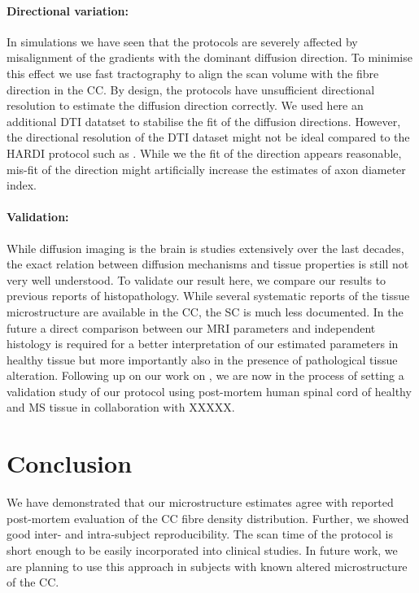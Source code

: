 \paragraph{Directional variation: } In simulations we have seen that the \SF{} protocols are severely affected by misalignment of the gradients with the dominant diffusion direction. To minimise this effect we use fast tractography to align the scan volume with the fibre direction in the CC. By design, the \SF{} protocols have unsufficient directional resolution to estimate the diffusion direction correctly. We used here an additional DTI datatset to stabilise the fit of the diffusion directions. However, the directional resolution of the DTI dataset might not be ideal compared to the HARDI protocol such as \OI. While we the fit of the direction appears reasonable, mis-fit of the direction might artificially increase the estimates of axon diameter index. 

\paragraph{Validation: } While diffusion imaging is the brain is studies extensively over the last decades, the exact relation between diffusion mechanisms and tissue properties is still not very well understood. To validate our result here, we compare our results to previous reports of histopathology. While several systematic reports of the tissue microstructure are available in the CC, the SC is much less documented. In the future a direct comparison between our MRI parameters and independent histology is required for a better interpretation of our estimated parameters in healthy tissue but more importantly also in the presence of pathological tissue alteration. Following up on our work on \SFasym{}, we are now in the process of setting a validation study of our protocol using post-mortem human spinal cord of healthy and MS tissue in collaboration with XXXXX.


\section{Conclusion}
We have demonstrated that our microstructure estimates agree with reported post-mortem evaluation of the CC fibre density distribution. Further, we showed good inter- and intra-subject reproducibility. The scan time of the protocol is short enough to be easily incorporated into clinical studies. In future work, we are planning to use this approach in subjects with known altered microstructure of the CC.